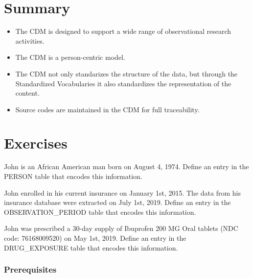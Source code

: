\documentclass[11pt]{book}
\theoremstyle{definition}
\theoremstyle{definition}
\theoremstyle{definition}
\theoremstyle{remark}
\let\BeginKnitrBlock\begin \let\EndKnitrBlock\end
\begin{document}
\hypertarget{summary-2}{%
\section{Summary}\label{summary-2}}

\BeginKnitrBlock{rmdsummary}
\begin{itemize}
\item
  The CDM is designed to support a wide range of observational research activities.
\item
  The CDM is a person-centric model.
\item
  The CDM not only standarizes the structure of the data, but through the Standardized Vocabularies it also standardizes the representation of the content.
\item
  Source codes are maintained in the CDM for full traceability.
\end{itemize}
\EndKnitrBlock{rmdsummary}

\hypertarget{exercises}{%
\section{Exercises}\label{exercises}}

\BeginKnitrBlock{exercise}
\protect\hypertarget{exr:exerciseJohnPerson}{}{\label{exr:exerciseJohnPerson} }John is an African American man born on August 4, 1974. Define an entry in the PERSON table that encodes this information.
\EndKnitrBlock{exercise}

\BeginKnitrBlock{exercise}
\protect\hypertarget{exr:exerciseJohnOp}{}{\label{exr:exerciseJohnOp} }John enrolled in his current insurance on January 1st, 2015. The data from his insurance database were extracted on July 1st, 2019. Define an entry in the OBSERVATION\_PERIOD table that encodes this information.
\EndKnitrBlock{exercise}

\BeginKnitrBlock{exercise}
\protect\hypertarget{exr:exerciseJohnDrug}{}{\label{exr:exerciseJohnDrug} }John was prescribed a 30-day supply of Ibuprofen 200 MG Oral tablets (NDC code: 76168009520) on May 1st, 2019. Define an entry in the DRUG\_EXPOSURE table that encodes this information.
\EndKnitrBlock{exercise}

\hypertarget{prerequisites}{%
\subsubsection*{Prerequisites}\label{prerequisites}}
\end{document}
